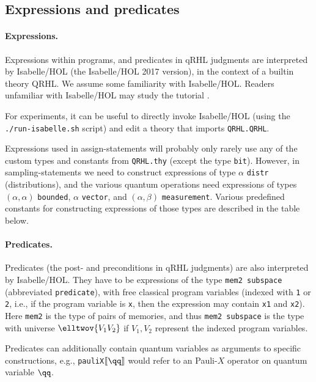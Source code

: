 \documentclass{article}
\begin{document}
\subsection{Expressions and predicates}
\label{sec:tool.pred}

\newcommand\tooltype[1]{\index{#1@\textttOLD{#1} (Isabelle/HOL type)}}

\paragraph{Expressions.}
Expressions within programs, and predicates in qRHL judgments are
interpreted by Isabelle/HOL (the Isabelle/HOL 2017 version), in the
context of a builtin theory QRHL. We assume some familiarity with
Isabelle/HOL. Readers unfamiliar with Isabelle/HOL may study the
tutorial \cite{isabelle-tutorial}.

For experiments, it can be useful to directly invoke Isabelle/HOL
(using the \texttt{./run-isabelle.sh} script) and edit a theory that
imports \texttt{QRHL.QRHL}.

Expressions used in assign-statements will probably only rarely use
any of the custom types and constants from \texttt{QRHL.thy} (except the type
\texttt{bit}). However, in sampling-statements we need to construct
expressions of type $\alpha$
\texttt{distr} (distributions), and the various quantum operations
need expressions of types $(\alpha,\alpha)$
\texttt{bounded}, $\alpha$
\texttt{vector}, and $(\alpha,\beta)$
\texttt{measurement}. Various predefined constants for constructing
expressions of those types are described in the table below.


\paragraph{Predicates.} Predicates (the post- and preconditions in
qRHL judgments) are also interpreted by Isabelle/HOL. They have to be
expressions of the type \texttt{mem2 subspace} (abbreviated \texttt{predicate}),
with free classical
program variables (indexed with \texttt{1} or \texttt{2}, i.e., if the
program variable is \texttt{x}, then the expression may contain
\texttt{x1} and \texttt{x2}). Here \texttt{mem2} is the type of pairs
of memories, and thus \texttt{mem2 subspace} is the type with universe
$\elltwov{V_1V_2}$
if $V_1,V_2$ represent the indexed program variables.

Predicates can additionally contain quantum variables as arguments to
specific constructions, e.g., \texttt{pauliX\guillemotright$\llbracket\qq\rrbracket$}
would refer to an Pauli-$X$ operator on quantum variable $\qq$.
\end{document}
